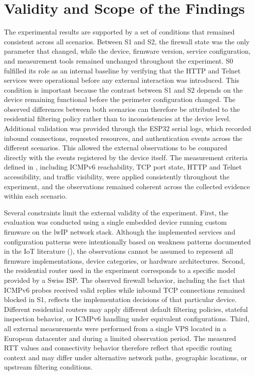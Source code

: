 \section{Validity and Scope of the Findings}\label{sec:discussion-validity-scope}

The experimental results are supported by a set of conditions that remained consistent across all scenarios. Between S1 and S2, the firewall state was the only parameter that changed, while the device, firmware version, service configuration, and measurement tools remained unchanged throughout the experiment. S0 fulfilled its role as an internal baseline by verifying that the HTTP and Telnet services were operational before any external interaction was introduced. This condition is important because the contrast between S1 and S2 depends on the device remaining functional before the perimeter configuration changed. The observed differences between both scenarios can therefore be attributed to the residential filtering policy rather than to inconsistencies at the device level. Additional validation was provided through the ESP32 serial logs, which recorded inbound connections, requested resources, and authentication events across the different scenarios. This allowed the external observations to be compared directly with the events registered by the device itself. The measurement criteria defined in , including ICMPv6 reachability, TCP port state, HTTP and Telnet accessibility, and traffic visibility, were applied consistently throughout the experiment, and the observations remained coherent across the collected evidence within each scenario.

Several constraints limit the external validity of the experiment. First, the evaluation was conducted using a single embedded device running custom firmware on the lwIP network stack. Although the implemented services and configuration patterns were intentionally based on weakness patterns documented in the IoT literature (), the observations cannot be assumed to represent all firmware implementations, device categories, or hardware architectures. Second, the residential router used in the experiment corresponds to a specific model provided by a Swiss ISP. The observed firewall behavior, including the fact that ICMPv6 probes received valid replies while inbound TCP connections remained blocked in S1, reflects the implementation decisions of that particular device. Different residential routers may apply different default filtering policies, stateful inspection behavior, or ICMPv6 handling under equivalent configurations. Third, all external measurements were performed from a single VPS located in a European datacenter and during a limited observation period. The measured RTT values and connectivity behavior therefore reflect that specific routing context and may differ under alternative network paths, geographic locations, or upstream filtering conditions.

